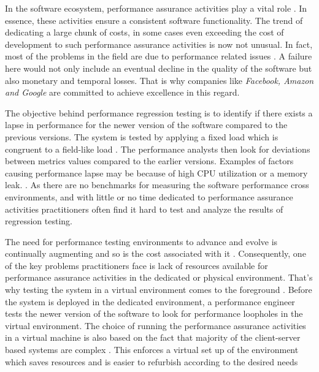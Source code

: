 
In the software ecosystem, performance assurance activities play a vital role \cite{Shang:2015:ADP:2668930.2688052}. In essence, these activities ensure a consistent software functionality. The trend of dedicating a large chunk of costs, in some cases even exceeding the cost of development \cite{bertolino2007software} to such performance assurance activities is now not unusual. In fact, most of the problems in the field are due to performance related issues \cite{foo2010mining} . A failure here would not only include an eventual decline in the quality of the software but also monetary and temporal losses. That is why companies like \textit{Facebook, Amazon and Google} are committed to achieve excellence in this regard. \cite{jackson2010performance}

The objective behind performance regression testing is to identify if there exists a lapse in performance for the newer version of the software compared to the previous versions. The system is tested by applying a fixed load which is congruent to a field-like load \cite{Shang:2015:ADP:2668930.2688052} \cite{foo2010mining} \cite{5306331}. The performance analysts then look for deviations between metrics values compared to the earlier versions. Examples of factors causing performance lapse may be because of high CPU utilization or a memory leak. \cite{5306331}. As there are no benchmarks for measuring the software performance cross environments, and with little or no time dedicated to performance assurance activities practitioners often find it hard to test and analyze the results of regression testing.

The need for performance testing environments to advance and evolve is continually augmenting and so is the cost associated with it \cite{stpmag} \cite{bertolino2007software}. Consequently, one of the key problems practitioners face is lack of resources available for performance assurance activities in the dedicated or physical environment. That's why testing the system in a virtual environment comes to the foreground \cite{vmwarehighcost}. Before the system is deployed in the dedicated environment, a performance engineer tests the newer version of the software to look for performance loopholes in the virtual environment. The choice of running the performance assurance activities in a virtual machine is also based on the fact that majority of the client-server based systems are complex \cite{BumHyunLim}. This enforces a virtual set up of the environment which saves resources and is easier to refurbish according to the desired needs \cite{VMWarePowerCLIBlog}\cite{seetharaman2006test}  

